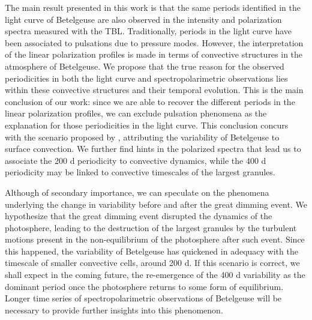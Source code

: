 \documentclass{aa}
\begin{document}
The main result presented in this work is that the same periods identified in the light curve of Betelgeuse are also observed in the intensity and polarization
spectra measured with the TBL. Traditionally, periods in the light curve have been associated to pulsations due to pressure modes.
However, the interpretation of the linear polarization profiles is made in terms of convective structures in the atmosphere of Betelgeuse. We propose that the true reason for the observed periodicities in both the light curve and spectropolarimetric observations lies within these convective structures and their temporal evolution.
This is the main conclusion of our work: since we are able to recover the different periods in the linear polarization profiles, we can exclude pulsation phenomena as the explanation for those periodicities in the light curve. This conclusion concurs with the scenario proposed by \cite{gray_mass_2008}, attributing the variability of Betelgeuse to surface convection.
 We further find hints in the polarized spectra that lead us to associate the 200 d periodicity to convective dynamics, while the 400 d periodicity may be linked to convective timescales of the largest granules.  

Although of secondary importance, we can speculate on the phenomena underlying the change in variability before and after the great dimming event. We hypothesize that the great dimming event disrupted the dynamics of the photosphere, 
leading to the destruction of the largest granules by the turbulent motions present in the non-equilibrium of the photosphere after such event. Since this happened, the variability of Betelgeuse has quickened in adequacy with the timescale of smaller convective cells, around 200 d. If this scenario is correct, we shall expect in the coming future, the re-emergence of the 400 d variability as the dominant period once the photosphere returns to some form of equilibrium. Longer time 
series of spectropolarimetric observations of Betelgeuse will be necessary to provide further insights into this phenomenon.
\end{document}
